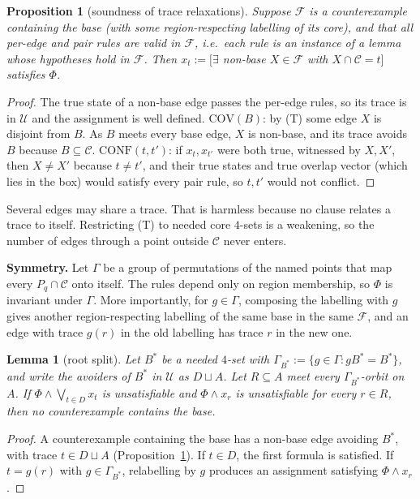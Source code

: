 \documentclass[11pt]{amsart}
\newtheorem{lemma}[theorem]{Lemma}
\newtheorem{proposition}[theorem]{Proposition}
\theoremstyle{definition}
\newcommand{\cF}{\mathcal{F}}
\newcommand{\cU}{\mathcal{U}}
\newcommand{\Cov}{\mathrm{COV}}
\newcommand{\Conf}{\mathrm{CONF}}
\begin{document}
\begin{proposition}[soundness of trace relaxations]\label{prop:sound}
Suppose $\cF$ is a counterexample containing the base (with some region-respecting labelling of its core), and that all per-edge and pair rules are valid in $\cF$, i.e.\ each rule is an instance of a lemma whose hypotheses hold in $\cF$. Then $x_t:=[\exists$ non-base $X\in\cF$ with $X\cap\mathcal C=t]$ satisfies $\Phi$.
\end{proposition}
\begin{proof}
The true state of a non-base edge passes the per-edge rules, so its trace is in $\cU$ and the assignment is well defined. $\Cov(B)$: by (T) some edge $X$ is disjoint from $B$. As $B$ meets every base edge, $X$ is non-base, and its trace avoids $B$ because $B\subseteq\mathcal C$. $\Conf(t,t')$: if $x_t,x_{t'}$ were both true, witnessed by $X,X'$, then $X\ne X'$ because $t\ne t'$, and their true states and true overlap vector (which lies in the box) would satisfy every pair rule, so $t,t'$ would not conflict.
\end{proof}

Several edges may share a trace. That is harmless because no clause relates a trace to itself. Restricting (T) to needed core $4$-sets is a weakening, so the number of edges through a point outside $\mathcal C$ never enters.

\textbf{Symmetry.} Let $\Gamma$ be a group of permutations of the named points that map every $P_q\cap\mathcal C$ onto itself. The rules depend only on region membership, so $\Phi$ is invariant under $\Gamma$. More importantly, for $g\in\Gamma$, composing the labelling with $g$ gives another region-respecting labelling of the same base in the same $\cF$, and an edge with trace $g(r)$ in the old labelling has trace $r$ in the new one.

\begin{lemma}[root split]\label{lem:root}
Let $B^*$ be a needed $4$-set with $\Gamma_{B^*}:=\{g\in\Gamma:gB^*=B^*\}$, and write the avoiders of $B^*$ in $\cU$ as $D\sqcup A$. Let $R\subseteq A$ meet every $\Gamma_{B^*}$-orbit on $A$. If $\Phi\wedge\bigvee_{t\in D}x_t$ is unsatisfiable and $\Phi\wedge x_r$ is unsatisfiable for every $r\in R$, then no counterexample contains the base.
\end{lemma}
\begin{proof}
A counterexample containing the base has a non-base edge avoiding $B^*$, with trace $t\in D\sqcup A$ (Proposition~\ref{prop:sound}). If $t\in D$, the first formula is satisfied. If $t=g(r)$ with $g\in\Gamma_{B^*}$, relabelling by $g$ produces an assignment satisfying $\Phi\wedge x_r$.
\end{proof}
\end{document}
